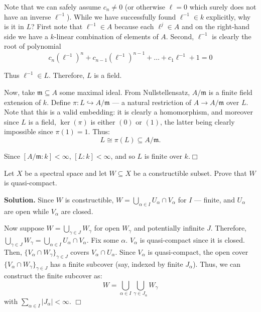 \documentclass{template}
\newcommand{\qedwhite}{\hfill \ensuremath{\Box}}
\begin{document}
Note that we can safely assume $c_n \neq 0$ (or otherwise $\ell=0$ which surely
does not have an inverse $\ell^{-1}$). While we have successfully found
$\ell^{-1} \in k$ explicitly, why is it in $L$? First note that $\ell^{-1} \in
A$ because each $\ell^j \in A$ and on the right-hand side we have a $k$-linear
combination of elements of $A$. Second, $\ell^{-1}$ is clearly the root of
polynomial 
\begin{equation*}
    c_n(\ell^{-1})^n + c_{n-1}(\ell^{-1})^{n-1} + \dots + c_1\ell^{-1} + 1 = 0
\end{equation*}

Thus $\ell^{-1} \in L$. Therefore, $L$ is a field. 

Now, take $\mathfrak{m} \subseteq A$ some maximal ideal. From Nullstellensatz,
$A/\mathfrak{m}$ is a finite field extension of $k$. Define $\pi: L
\hookrightarrow A/\mathfrak{m}$ --- a natural restriction of $A \to
A/\mathfrak{m}$ over $L$. Note that this is a valid embedding: it is clearly a
homomorphism, and moreover since $L$ is a field, $\ker(\pi)$ is either $(0)$ or
$(1)$, the latter being clearly impossible since $\pi(1)=1$. Thus:
\begin{equation*}
    L \cong \pi(L) \subseteq A/\mathfrak{m}.
\end{equation*}

Since $[A/\mathfrak{m}:k] < \infty$, $[L:k]<\infty$, and so $L$ is finite over
$k$.\qedwhite

\begin{problem}[Exercise 4]
    Let $X$ be a spectral space and let $W \subseteq X$ be a constructible subset. 
    Prove that $W$ is quasi-compact.
\end{problem}

\textbf{Solution.} Since $W$ is constructible, $W = \bigcup_{\alpha \in I}
U_{\alpha} \cap V_{\alpha}$ for $I$ --- finite, and $U_{\alpha}$
are open while $V_{\alpha}$ are closed.

Now suppose $W = \bigcup_{\gamma \in J} W_{\gamma}$ for open $W_{\gamma}$ and
potentially infinite $J$. Therefore, $\bigcup_{\gamma \in J} W_{\gamma} =
\bigcup_{\alpha \in I} U_{\alpha} \cap V_{\alpha}$. Fix some $\alpha$.
$V_{\alpha}$ is quasi-compact since it is closed. Then, $\{V_{\alpha} \cap
W_{\gamma}\}_{\gamma \in J}$ covers $V_{\alpha} \cap U_{\alpha}$. Since
$V_{\alpha}$ is quasi-compact, the open cover $\{V_{\alpha} \cap
W_{\gamma}\}_{\gamma \in J}$ has a finite subcover (say, indexed by finite
$J_{\alpha}$). Thus, we can construct the finite subcover as:
\begin{equation*}
    W = \bigcup_{\alpha \in I}\bigcup_{\gamma \in J_{\alpha}} W_{\gamma}
\end{equation*}
with $\sum_{\alpha \in I}|J_{\alpha}| < \infty$. \qedwhite
\end{document}
